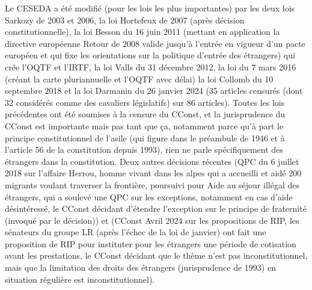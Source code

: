 \documentclass[math]{cours}
\begin{document}
Le CESEDA a été modifié (pour les lois les plus importantes) par les deux lois Sarkozy de 2003 et 2006,
la loi Hortefeux de 2007 (après décision constitutionnelle),
la loi Besson du 16 juin 2011 (mettant en application la directive européenne Retour de 2008 valide jusqu'à l'entrée en vigueur d'un pacte européen et qui fixe les orientations sur la politique d'entrée des étrangers) qui crée l'OQTF et l'IRTF, la loi Valls du 31 décembre 2012, la loi du 7 mars 2016 (créant la carte pluriannuelle et l'OQTF avec délai)
la loi Collomb du 10 septembre 2018 et la loi Darmanin du 26 janvier 2024 (35 articles censurés (dont 32 considérés comme des cavaliers législatifs) sur 86 articles).
Toutes les lois précédentes ont été soumises à la censure du CConst, et la jurisprudence du CConst est importante mais pas tant que ça, notamment parce qu'à part le principe constitutionnel de l'asile (qui figure dans le préambule de 1946 et à l'article 56 de la constitution depuis 1993), rien ne parle spécifiquement des étrangers dans la constitution.
Deux autres décisions récentes (QPC du 6 juillet 2018 sur l'affaire Herrou, homme vivant dans les alpes qui a accueilli et aidé 200 migrants voulant traverser la frontière, poursuivi pour Aide au séjour illégal des étrangers,
qui a soulevé une QPC sur les exceptions, notamment en cas d'aide désintéressé,
le CConst décidant d'étendre l'exception sur le principe de fraternité (invoqué par le décision)) et
(CConst Avril 2024 sur les propositions de RIP, les sénateurs du groupe LR (après l'échec de la loi de janvier) ont fait une proposition de RIP pour instituter pour les étrangers une période de cotisation avant les prestations, le CConst décidant que le thème n'est pas inconstitutionnel, mais que la limitation des droits des étrangers (jurisprudence de 1993) en situation régulière est inconstitutionnel).
\end{document}
